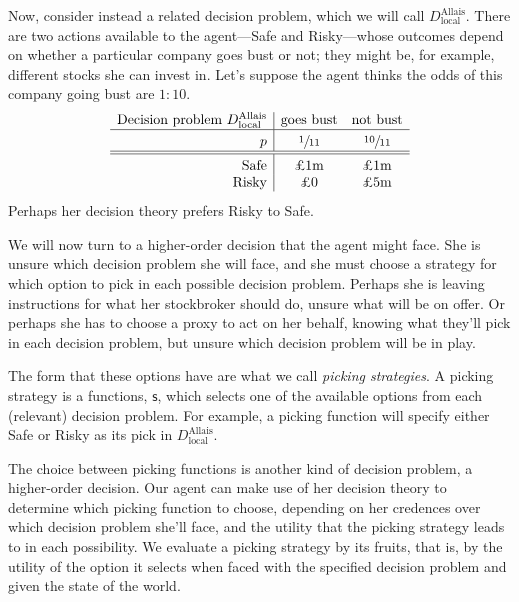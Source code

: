\documentclass[a4paper]{article}
\newcommand\Tstrut{\rule{0pt}{2.6ex}}       %
\newcommand\Bstrut{\rule[-0.9ex]{0pt}{0pt}} %
\newcommand\s{\mathsf{s}}
\newenvironment{CCM rewritten}
{\begingroup\color{blue}} %
{\endgroup}              %
\begin{document}
Now, consider instead a related decision problem, which we will call $D^{\mathrm{Allais}}_{\mathrm{local}}$. There are two actions available to the agent---Safe and Risky---whose outcomes depend on whether a particular company goes bust or not; they might be, for example, different stocks she can invest in. Let's suppose the agent thinks the odds of this company going bust are $1:10$. 
$$
\begin{array}{r|cc}
	\text{Decision problem } D^{\mathrm{Allais}}_{\mathrm{local}} & \text{goes bust} &  \text{not bust} \Bstrut\\\hline \Tstrut
	p & \sfrac{1}{11} & \sfrac{10}{11}\Bstrut\\\hline\hline \Tstrut
	\text{Safe} &\text{\pounds 1m}&\text{\pounds 1m}                      \\
	\text{Risky} & \text{\pounds 0}&\text{\pounds 5m}
\end{array}
$$
Perhaps her decision theory prefers Risky to Safe. 

We will now turn to a higher-order decision that the agent might face.   She is unsure which decision problem she will face, and she must choose a strategy for which option to pick in each possible decision problem. Perhaps she is leaving instructions for what her stockbroker should do, unsure what will be on offer. Or perhaps she has to choose a proxy to act on her behalf, knowing what they'll pick in each decision problem, but unsure which decision problem will be in play. 


The form that these options have are what we call \emph{picking strategies}. 
A picking strategy is a functions, $\s$, which selects one of the available options from each (relevant) decision problem. 
For example, a picking function will specify either Safe or Risky as its pick in $D^{\mathrm{Allais}}_{\mathrm{local}}$.

The choice between picking functions is another kind of decision problem, a higher-order decision. Our agent can make use of her decision theory to determine which picking function to choose, depending on her credences over which decision problem she'll face, and the utility that the picking strategy leads to in each possibility. We evaluate a picking strategy by its fruits, that is, by the utility of the option it selects when faced with the specified decision problem and given the state of the world.
\end{document}
